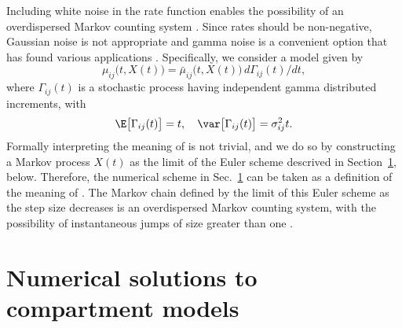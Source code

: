 Including white noise in the rate function enables the possibility of an overdispersed Markov counting system \citep{breto11,breto09,he10}.
Since rates should be non-negative, Gaussian noise is not appropriate and gamma noise is a convenient option that has found various applications \citep{romero-severson15, subramanian20}.
Specifically, we consider a model given by
\begin{equation}
\label{eq:odmcs1}
\mu_{ij}\big(t,X(t)\big) = \bar\mu_{ij}\big(t,X(t)\big) \, d\Gamma_{ij}(t)/dt,
\end{equation}
where $\Gamma_{ij}(t)$ is a stochastic process having independent gamma distributed increments, with
\begin{equation}
\label{eq:odmcs2}
\E\big[\Gamma_{ij}(t)\big] = t, \quad \var\big[\Gamma_{ij}(t)\big] = \sigma_{ij}^2 t.
\end{equation}
Formally interpreting the meaning of  is not trivial, and we do so by constructing a Markov process $X(t)$ as the limit of the Euler scheme descrived in Section~\ref{sec:numerics}, below.
Therefore, the numerical scheme in Sec.~\ref{sec:numerics} can be taken as a definition of the meaning of .
The Markov chain defined by the limit of this Euler scheme as the step size decreases is an overdispersed Markov counting system, with the possibility of instantaneous jumps of size greater than one \citep{breto11}.

\section{Numerical solutions to compartment models}
\label{sec:numerics}

